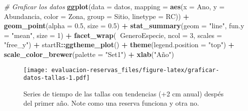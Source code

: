 \documentclass[]{krantz}
\newenvironment{Shaded}{\begin{snugshade}}{\end{snugshade}}
\newcommand{\CommentTok}[1]{\textcolor[rgb]{0.56,0.35,0.01}{\textit{#1}}}
\newcommand{\DataTypeTok}[1]{\textcolor[rgb]{0.13,0.29,0.53}{#1}}
\newcommand{\DecValTok}[1]{\textcolor[rgb]{0.00,0.00,0.81}{#1}}
\newcommand{\FloatTok}[1]{\textcolor[rgb]{0.00,0.00,0.81}{#1}}
\newcommand{\KeywordTok}[1]{\textcolor[rgb]{0.13,0.29,0.53}{\textbf{#1}}}
\newcommand{\NormalTok}[1]{#1}
\newcommand{\OperatorTok}[1]{\textcolor[rgb]{0.81,0.36,0.00}{\textbf{#1}}}
\newcommand{\StringTok}[1]{\textcolor[rgb]{0.31,0.60,0.02}{#1}}
\begin{document}
\begin{Shaded}
\begin{Highlighting}[]
\CommentTok{# Graficar los datos}
\KeywordTok{ggplot}\NormalTok{(}\DataTypeTok{data =}\NormalTok{ datos,}
       \DataTypeTok{mapping =} \KeywordTok{aes}\NormalTok{(}\DataTypeTok{x =}\NormalTok{ Ano, }\DataTypeTok{y =}\NormalTok{ Abundancia,}
                     \DataTypeTok{color =}\NormalTok{ Zona, }\DataTypeTok{group =}\NormalTok{ Sitio, }\DataTypeTok{linetype =}\NormalTok{ RC)) }\OperatorTok{+}
\StringTok{  }\KeywordTok{geom_point}\NormalTok{(}\DataTypeTok{alpha =} \FloatTok{0.5}\NormalTok{, }\DataTypeTok{size =} \FloatTok{0.5}\NormalTok{) }\OperatorTok{+}
\StringTok{  }\KeywordTok{stat_summary}\NormalTok{(}\DataTypeTok{geom =} \StringTok{"line"}\NormalTok{, }\DataTypeTok{fun.y =} \StringTok{"mean"}\NormalTok{, }\DataTypeTok{size =} \DecValTok{1}\NormalTok{) }\OperatorTok{+}
\StringTok{  }\KeywordTok{facet_wrap}\NormalTok{(}\OperatorTok{~}\NormalTok{GeneroEspecie, }\DataTypeTok{ncol =} \DecValTok{3}\NormalTok{, }\DataTypeTok{scales =} \StringTok{"free_y"}\NormalTok{) }\OperatorTok{+}
\StringTok{  }\NormalTok{startR}\OperatorTok{::}\KeywordTok{ggtheme_plot}\NormalTok{() }\OperatorTok{+}
\StringTok{  }\KeywordTok{theme}\NormalTok{(}\DataTypeTok{legend.position =} \StringTok{"top"}\NormalTok{) }\OperatorTok{+}
\StringTok{  }\KeywordTok{scale_color_brewer}\NormalTok{(}\DataTypeTok{palette =} \StringTok{"Set1"}\NormalTok{) }\OperatorTok{+}
\StringTok{  }\KeywordTok{xlab}\NormalTok{(}\StringTok{"Año"}\NormalTok{)}
\end{Highlighting}
\end{Shaded}

\begin{figure}
\centering
\texttt{[image: evaluacion-reservas\_files/figure-latex/graficar-datos-tallas-1.pdf]}
\caption{\label{fig:graficar-datos-tallas}Series de tiempo de las tallas con
tendencias (+2 cm anual) despés del primer año. Note como una reserva
funciona y otra no.}
\end{figure}



\backmatter
\printindex
\end{document}
